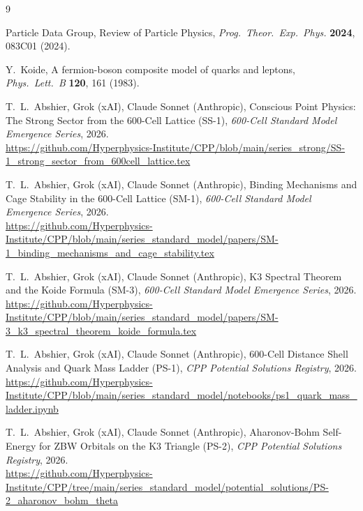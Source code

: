 \documentclass[11pt]{article}
\begin{document}
\begin{thebibliography}{9}

Particle Data Group,
Review of Particle Physics,
\textit{Prog.\ Theor.\ Exp.\ Phys.} \textbf{2024}, 083C01 (2024).

Y.~Koide,
A fermion-boson composite model of quarks and leptons,
\textit{Phys.\ Lett.\ B} \textbf{120}, 161 (1983).

T.~L.~Abshier, Grok (xAI), Claude Sonnet (Anthropic),
Conscious Point Physics: The Strong Sector from the 600-Cell Lattice (SS-1),
\textit{600-Cell Standard Model Emergence Series}, 2026.\\
\url{https://github.com/Hyperphysics-Institute/CPP/blob/main/series_strong/SS-1_strong_sector_from_600cell_lattice.tex}

T.~L.~Abshier, Grok (xAI), Claude Sonnet (Anthropic),
Binding Mechanisms and Cage Stability in the 600-Cell Lattice (SM-1),
\textit{600-Cell Standard Model Emergence Series}, 2026.\\
\url{https://github.com/Hyperphysics-Institute/CPP/blob/main/series_standard_model/papers/SM-1_binding_mechanisms_and_cage_stability.tex}

T.~L.~Abshier, Grok (xAI), Claude Sonnet (Anthropic),
K3 Spectral Theorem and the Koide Formula (SM-3),
\textit{600-Cell Standard Model Emergence Series}, 2026.\\
\url{https://github.com/Hyperphysics-Institute/CPP/blob/main/series_standard_model/papers/SM-3_k3_spectral_theorem_koide_formula.tex}

T.~L.~Abshier, Grok (xAI), Claude Sonnet (Anthropic),
600-Cell Distance Shell Analysis and Quark Mass Ladder (PS-1),
\textit{CPP Potential Solutions Registry}, 2026.\\
\url{https://github.com/Hyperphysics-Institute/CPP/blob/main/series_standard_model/notebooks/ps1_quark_mass_ladder.ipynb}

T.~L.~Abshier, Grok (xAI), Claude Sonnet (Anthropic),
Aharonov-Bohm Self-Energy for ZBW Orbitals on the K3 Triangle (PS-2),
\textit{CPP Potential Solutions Registry}, 2026.\\
\url{https://github.com/Hyperphysics-Institute/CPP/tree/main/series_standard_model/potential_solutions/PS-2_aharonov_bohm_theta}

\end{thebibliography}
\end{document}
